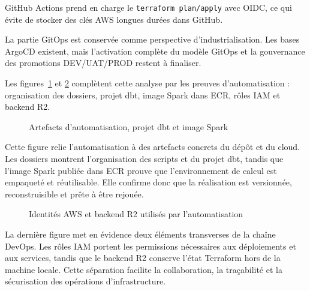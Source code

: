 GitHub Actions prend en charge le \texttt{terraform plan/apply} avec OIDC, ce qui évite de stocker des clés AWS longues durées dans GitHub.

La partie GitOps est conservée comme perspective d'industrialisation. Les bases ArgoCD existent, mais l'activation complète du modèle GitOps et la gouvernance des promotions DEV/UAT/PROD restent à finaliser.

Les figures~\ref{fig:realisation-artefacts-ecr} et \ref{fig:realisation-iam-r2} complètent cette analyse par les preuves d'automatisation : organisation des dossiers, projet dbt, image Spark dans ECR, rôles IAM et backend R2.

\begin{figure}[H]
\centering
{}
\caption{Artefacts d'automatisation, projet dbt et image Spark}
\label{fig:realisation-artefacts-ecr}
\end{figure}

Cette figure relie l'automatisation à des artefacts concrets du dépôt et du cloud. Les dossiers montrent l'organisation des scripts et du projet dbt, tandis que l'image Spark publiée dans ECR prouve que l'environnement de calcul est empaqueté et réutilisable. Elle confirme donc que la réalisation est versionnée, reconstruisible et prête à être rejouée.

\begin{figure}[H]
\centering
{}
\caption{Identités AWS et backend R2 utilisés par l'automatisation}
\label{fig:realisation-iam-r2}
\end{figure}

La dernière figure met en évidence deux éléments transverses de la chaîne DevOps. Les rôles IAM portent les permissions nécessaires aux déploiements et aux services, tandis que le backend R2 conserve l'état Terraform hors de la machine locale. Cette séparation facilite la collaboration, la traçabilité et la sécurisation des opérations d'infrastructure.

